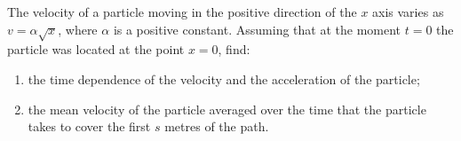 
\item The velocity of a particle moving in the positive direction of the \( x \) axis varies as \( v = \alpha\sqrt{x} \), where \( \alpha \) is a positive constant. Assuming that at the moment \( t = 0 \) the particle was located at the point \( x = 0 \), find:
    \begin{enumerate}
        \item the time dependence of the velocity and the acceleration of the particle;
        \item the mean velocity of the particle averaged over the time that the particle takes to cover the first \( s \) metres of the path.
    \end{enumerate}

